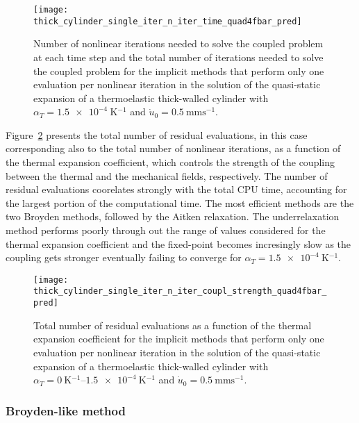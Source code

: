 \begin{figure}[htbp]
  \centering
  \texttt{[image: thick\_cylinder\_single\_iter\_n\_iter\_time\_quad4fbar\_pred]}
  \caption{Number of nonlinear iterations needed to solve the coupled problem at each time step and the total number of iterations needed to solve the coupled problem for the implicit methods that perform only one evaluation per nonlinear iteration  in the solution of the quasi-static expansion of a thermoelastic thick-walled cylinder with \(\alpha_T=\SI{1.5e-4}{\kelvin^{-1}}\) and \(\dot u_0 =\SI{0.5}{\milli\meter\second^{-1}}\).}
\label{fig:thick_cylinder_single_iter_n_iter_time_quad4fbar_pred}
\end{figure}

Figure~\ref{fig:thick_cylinder_single_iter_n_iter_coupl_strength_quad4fbar_pred} presents the total number of residual evaluations, in this case corresponding also to the total number of nonlinear iterations, as a function of the thermal expansion coefficient, which controls the strength of the coupling between the thermal and the mechanical fields, respectively.
The number of residual evaluations coorelates strongly with the total CPU time, accounting for the largest portion of the computational time.
The most efficient methods are the two Broyden methods, followed by the Aitken relaxation.
The underrelaxation method performs poorly through out the range of values considered for the thermal expansion coefficient and the fixed-point becomes incresingly slow as the coupling gets stronger eventually failing to converge for \(\alpha_T=\SI{1.5e-4}{\kelvin^{-1}}\).

\begin{figure}[htbp]
  \centering
  \texttt{[image: thick\_cylinder\_single\_iter\_n\_iter\_coupl\_strength\_quad4fbar\_pred]}
  \caption{Total number of residual evaluations as a function of the thermal expansion coefficient for the implicit methods that perform only one evaluation per nonlinear iteration in the solution of the quasi-static expansion of a thermoelastic thick-walled cylinder with \(\alpha_T=\SIrange{0}{1.5e-4}{\kelvin^{-1}}\) and \(\dot u_0 =\SI{0.5}{\milli\meter\second^{-1}}\).}
\label{fig:thick_cylinder_single_iter_n_iter_coupl_strength_quad4fbar_pred}
\end{figure}

\FloatBarrier

\subsubsection{Broyden-like method}

